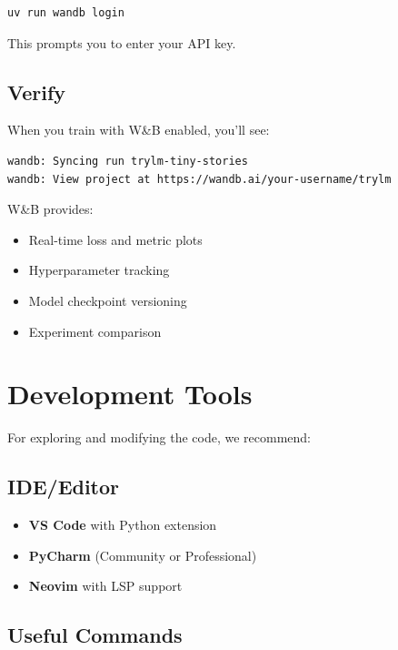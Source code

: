 \begin{lstlisting}[style=shell]
uv run wandb login
\end{lstlisting}

This prompts you to enter your API key.

\subsection{Verify}

When you train with W\&B enabled, you'll see:
\begin{lstlisting}[style=shell, numbers=none]
wandb: Syncing run trylm-tiny-stories
wandb: View project at https://wandb.ai/your-username/trylm
\end{lstlisting}

W\&B provides:
\begin{itemize}
    \item Real-time loss and metric plots
    \item Hyperparameter tracking
    \item Model checkpoint versioning
    \item Experiment comparison
\end{itemize}

\section{Development Tools}

For exploring and modifying the code, we recommend:

\subsection{IDE/Editor}

\begin{itemize}
    \item \textbf{VS Code} with Python extension
    \item \textbf{PyCharm} (Community or Professional)
    \item \textbf{Neovim} with LSP support
\end{itemize}

\subsection{Useful Commands}

